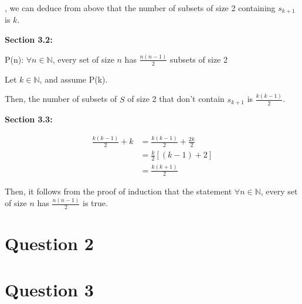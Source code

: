 \documentclass[12pt]{article}
\begin{document}
\begin{enumerate}[a.]
    \bigskip

    , we can deduce from above that the number of subsets of size 2 containing
    $s_{k+1}$ is $k$.

    \bigskip

    \textbf{Section 3.2:}

    \bigskip

    P(n): $\forall n \in \mathbb{N}$, every set of size $n$ has $\frac{n(n-1)}{2}$
    subsets of size 2

    \bigskip

    Let $k \in \mathbb{N}$, and assume P(k).

    \bigskip

    Then, the number of subsets of $S$ of size 2 that don't contain $s_{k+1}$ is
    $\frac{k(k-1)}{2}$.

    \bigskip

    \textbf{Section 3.3:}

    \begin{align}
        \frac{k(k-1)}{2} + k &= \frac{k(k-1)}{2} + \frac{2k}{2}\\
        &= \frac{k}{2}\left[(k-1) + 2\right]\\
        &= \frac{k(k+1)}{2}
    \end{align}

    \bigskip

    Then, it follows from the proof of induction that the statement $\forall n
    \in \mathbb{N}$, every set of size $n$ has $\frac{n(n-1)}{2}$ is true.

\end{enumerate}

\section*{Question 2}

\section*{Question 3}
\end{document}
